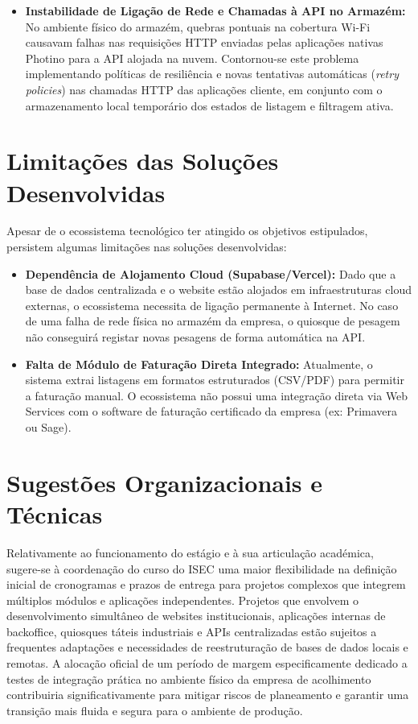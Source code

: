 \begin{itemize}
    \item \textbf{Instabilidade de Ligação de Rede e Chamadas à API no Armazém:} No ambiente físico do armazém, quebras pontuais na cobertura Wi-Fi causavam falhas nas requisições HTTP enviadas pelas aplicações nativas Photino para a API alojada na nuvem. Contornou-se este problema implementando políticas de resiliência e novas tentativas automáticas (\textit{retry policies}) nas chamadas HTTP das aplicações cliente, em conjunto com o armazenamento local temporário dos estados de listagem e filtragem ativa.
\end{itemize}

\section{Limitações das Soluções Desenvolvidas}

Apesar de o ecossistema tecnológico ter atingido os objetivos estipulados, persistem algumas limitações nas soluções desenvolvidas:
\begin{itemize}
    \item \textbf{Dependência de Alojamento Cloud (Supabase/Vercel):} Dado que a base de dados centralizada e o website estão alojados em infraestruturas cloud externas, o ecossistema necessita de ligação permanente à Internet. No caso de uma falha de rede física no armazém da empresa, o quiosque de pesagem não conseguirá registar novas pesagens de forma automática na API.
    \item \textbf{Falta de Módulo de Faturação Direta Integrado:} Atualmente, o sistema extrai listagens em formatos estruturados (\ac{CSV}/\ac{PDF}) para permitir a faturação manual. O ecossistema não possui uma integração direta via Web Services com o software de faturação certificado da empresa (ex: Primavera ou Sage).
\end{itemize}

\section{Sugestões Organizacionais e Técnicas}

Relativamente ao funcionamento do estágio e à sua articulação académica, sugere-se à coordenação do curso do ISEC uma maior flexibilidade na definição inicial de cronogramas e prazos de entrega para projetos complexos que integrem múltiplos módulos e aplicações independentes. Projetos que envolvem o desenvolvimento simultâneo de websites institucionais, aplicações internas de backoffice, quiosques táteis industriais e APIs centralizadas estão sujeitos a frequentes adaptações e necessidades de reestruturação de bases de dados locais e remotas. A alocação oficial de um período de margem especificamente dedicado a testes de integração prática no ambiente físico da empresa de acolhimento contribuiria significativamente para mitigar riscos de planeamento e garantir uma transição mais fluida e segura para o ambiente de produção.

